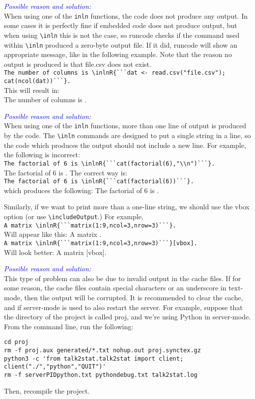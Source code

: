 \documentclass[a4paper,10pt]{article}
\newcommand{\cause}[1] {\noindent\textit{\textcolor{blue}{Possible reason and solution:}}\\#1}
\begin{document}
\cause\bgroup
When using one of the \verb|inln| functions, the code does not produce any output.
In some cases it is perfectly fine if embedded code does not produce output, but when using \verb|\inln| this is not the case, so runcode checks if the command used within \verb|\inln| produced a zero-byte output file. If it did, runcode will show an appropriate message, like in the following example. Note that the reason no output is produced is that file.csv does not exist.\\
\verb|The number of columns is \inlnR{```dat <- read.csv("file.csv"); cat(ncol(dat))```}.|\\
This will result in:\\
The number of columns is  .\\
\egroup

\cause\bgroup
When using one of the \verb|inln| functions, more than one line of output is produced by the code.
The \verb|\inln| commands are designed to put a single string in a line, so the code which produces the output should not include a new line. For example, the following is incorrect:\\
\verb|The factorial of 6 is \inlnR{```cat(factorial(6),"\\n")```}.|\\
The factorial of 6 is .
\noindent
The correct way is:\\
\verb|The factorial of 6 is \inlnR{```cat(factorial(6))```}.|\\
which produces the following: 
The factorial of 6 is .


\noindent
Similarly, if we want to print more than a one-line string, we should use the vbox option (or use \verb|\includeOutput|.) For example,\\
\verb|A matrix \inlnR{```matrix(1:9,ncol=3,nrow=3)```}.|\\
Will appear like this: A matrix .
\\
\verb|A matrix \inlnR{```matrix(1:9,ncol=3,nrow=3)```}[vbox].|\\
Will look better: A matrix [vbox].
\egroup


\cause\bgroup
This type of problem can also be due to invalid output in the cache files. If for some reason, the cache files contain special characters or an underscore in text-mode, then the output will be corrupted. It is recommended to clear the cache, and if server-mode is used to also restart the server. For example, suppose that the directory of the project is called proj, and we're using Python in server-mode. From the command line, run the following:
\begin{Verbatim}
cd proj
rm -f proj.aux generated/*.txt nohup.out proj.synctex.gz
python3 -c 'from talk2stat.talk2stat import client; client("./","python","QUIT")'
rm -f serverPIDpython.txt pythondebug.txt talk2stat.log
\end{Verbatim}
Then, recompile the project.\\
\egroup
\end{document}
